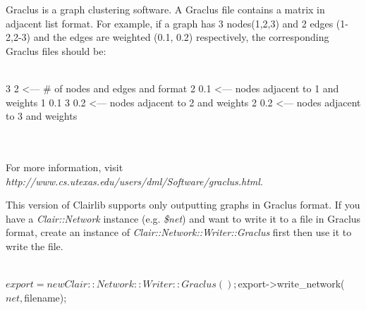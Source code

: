 Graclus is a graph clustering software. A Graclus file contains a matrix in adjacent list format. For example, if a graph has 3 nodes(1,2,3) and 2 edges (1-2,2-3) and the edges are weighted (0.1, 0.2) respectively, the corresponding Graclus files should be:
\\
\\
\begin{boxedverbatim}
3 2         <--- # of nodes and edges and format
2 0.1 	    <--- nodes adjacent to 1 and weights
1 0.1 3 0.2	<--- nodes adjacent to 2 and weights
2 0.2		<--- nodes adjacent to 3 and weights
\end{boxedverbatim}
\\
\\
For more information, visit \emph{http://www.cs.utexas.edu/users/dml/Software/graclus.html}.

This version of Clairlib supports only outputting graphs in Graclus format. If you have a \emph{Clair::Network} instance (e.g. \emph{\$net}) and want to write it to a file in Graclus format, create an instance of \emph{Clair::Network::Writer::Graclus} first then use it to write the file.
\\
\\
\begin{boxedverbatim}
$export = new Clair::Network::Writer::Graclus();
$export->write_network($net, $filename);
\end{boxedverbatim}
